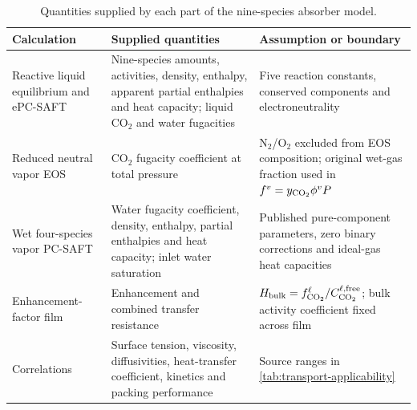 \begin{table}[pos=htbp]
\centering\small
\caption{Quantities supplied by each part of the nine-species absorber model.}
\label{tab:thermodynamic-responsibility}
\begin{tabularx}{\textwidth}{@{}>{\raggedright\arraybackslash}p{}>{\raggedright\arraybackslash}X>{\raggedright\arraybackslash}X@{}}
\toprule
Calculation & Supplied quantities & Assumption or boundary \\
\midrule
Reactive liquid equilibrium and ePC-SAFT & Nine-species amounts, activities, density, enthalpy, apparent partial enthalpies and heat capacity; liquid CO$_2$ and water fugacities & Five reaction constants, conserved components and electroneutrality \\
Reduced neutral vapor EOS & CO$_2$ fugacity coefficient at total pressure & N$_2$/O$_2$ excluded from EOS composition; original wet-gas fraction used in $f^v=y_{\COtwo}\phi^vP$ \\
Wet four-species vapor PC-SAFT & Water fugacity coefficient, density, enthalpy, partial enthalpies and heat capacity; inlet water saturation & Published pure-component parameters, zero binary corrections and ideal-gas heat capacities \\
Enhancement-factor film & Enhancement and combined transfer resistance & $H_{\mathrm{bulk}}=f^\ell_{\COtwo}/C^{\ell,\mathrm{free}}_{\COtwo}$; bulk activity coefficient fixed across film \\
Correlations & Surface tension, viscosity, diffusivities, heat-transfer coefficient, kinetics and packing performance & Source ranges in \cref{tab:transport-applicability} \\
\bottomrule
\end{tabularx}
\end{table}

